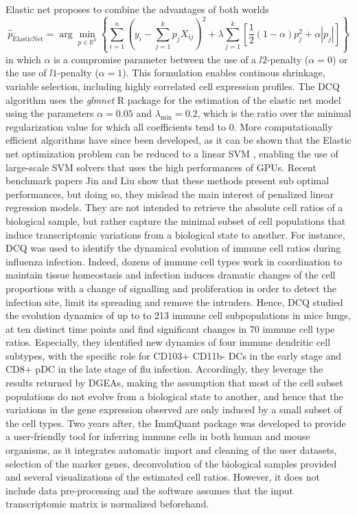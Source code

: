 Elastic net proposes to combine the advantages of both worlds
\autocite{zou_hastie05} \[
\hat{p}_{\text{ElasticNet}}  =  \arg \min_{p \in \mathbb{R}^k} \left\{\sum_{i=1}^n \left( y_i - \sum_{j=1}^k  p_j X_{ij}\right)^2 + \lambda \sum_{j=1}^k \left[ \frac{1}{2} (1 - \alpha) p_j^2 + \alpha  |p_j| \right] \right\}
\] in which \(\alpha\) is a compromise parameter between the use of a
\(l2\)-penalty (\(\alpha=0\)) or the use of \(l1\)-penalty
(\(\alpha=1\)). This formulation enables continous shrinkage, variable
selection, including highly correlated cell expression profiles. The DCQ
algorithm \autocite{altboum_etal14}
uses the \emph{glmnet} R package
\autocite{friedman_etal11} for the
estimation of the elastic net model using the parameters
\(\alpha =0.05\) and \(\lambda_{\min}=0.2\), which is the ratio over the
minimal regularization value for which all coefficients tend to 0. More
computationally efficient algorithms have since been developed, as it
can be shown that the Elastic net optimization problem can be reduced to
a linear SVM \autocite{zhou_etal14},
enabling the use of large-scale SVM solvers that uses the high
performances of GPUs. Recent benchmark papers Jin and Liu
\autocite{jin_liu21} show that these methods
present sub optimal performances, but doing so, they mislead the main
interest of penalized linear regression models. They are not intended to
retrieve the absolute cell ratios of a biological sample, but rather
capture the minimal subset of cell populations that induce
transcriptomic variations from a biological state to another. For
instance, DCQ was used to identify the dynamical evolution of immune
cell ratios during influenza infection. Indeed, dozens of immune cell
types work in coordination to maintain tissue homeostasis and infection
induces dramatic changes of the cell proportions with a change of
signalling and proliferation in order to detect the infection site,
limit its spreading and remove the intruders. Hence, DCQ studied the
evolution dynamics of up to to 213 immune cell subpopulations in mice
lungs, at ten distinct time points and find significant changes in 70
immune cell type ratios. Especially, they identified new dynamics of
four immune dendritic cell subtypes, with the specific role for CD103+
CD11b- DCs in the early stage and CD8+ pDC in the late stage of flu
infection. Accordingly, they leverage the results returned by DGEAs,
making the assumption that most of the cell subset populations do not
evolve from a biological state to another, and hence that the variations
in the gene expression observed are only induced by a small subset of
the cell types. Two years after, the ImmQuant package
\autocite{frishberg_etal16} was
developed to provide a user-friendly tool for inferring immune cells in
both human and mouse organisms, as it integrates automatic import and
cleaning of the user datasets, selection of the marker genes,
deconvolution of the biological samples provided and several
visualizations of the estimated cell ratios. However, it does not
include data pre-processing and the software assumes that the input
transcriptomic matrix is normalized beforehand.

